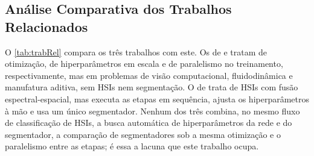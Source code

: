 \subsection{Análise Comparativa dos Trabalhos Relacionados}

O \autoref{tab:trabRel} compara os três trabalhos com este. Os de  e  tratam de otimização, de hiperparâmetros em escala e de paralelismo no treinamento, respectivamente, mas em problemas de visão computacional, fluidodinâmica e manufatura aditiva, sem HSIs nem segmentação. O de  trata de HSIs com fusão espectral-espacial, mas executa as etapas em sequência, ajusta os hiperparâmetros à mão e usa um único segmentador. Nenhum dos três combina, no mesmo fluxo de classificação de HSIs, a busca automática de hiperparâmetros da rede e do segmentador, a comparação de segmentadores sob a mesma otimização e o paralelismo entre as etapas; é essa a lacuna que este trabalho ocupa.

